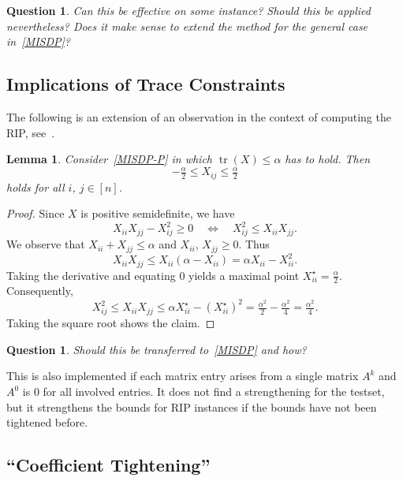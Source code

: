 \documentclass[10pt, a4paper]{article}
\DeclareMathOperator{\tr}{tr}
\newtheorem{lemma}[theorem]{Lemma}
\newtheorem{question}[theorem]{Question}
\begin{document}
\begin{question}
  Can this be effective on some instance? Should this be applied
  nevertheless? Does it make sense to extend the method for the general
  case in~\eqref{MISDP}?
\end{question}

\subsection{Implications of Trace Constraints}

The following is an extension of an observation in the context of computing
the RIP, see~\cite{GalP16}.

\begin{lemma}
  Consider~\eqref{MISDP-P} in which $\tr(X) \leq \alpha$ has to hold. Then
  \[
    -\tfrac{\alpha}{2} \leq X_{ij} \leq \tfrac{\alpha}{2}
  \]
  holds for all $i$, $j \in [n]$.
\end{lemma}

\begin{proof}
  Since $X$ is positive semidefinite, we have
  \[
    X_{ii} X_{jj} - X_{ij}^2 \geq 0
    \quad\Leftrightarrow\quad
    X_{ij}^2 \leq X_{ii} X_{jj}.
  \]
  We observe that $X_{ii} + X_{jj} \leq \alpha$ and $X_{ii}$,
  $X_{jj} \geq 0$. Thus
  \[
    X_{ii} X_{jj} \leq X_{ii} (\alpha - X_{ii}) = \alpha X_{ii} - X_{ii}^2.
  \]
  Taking the derivative and equating 0 yields a maximal point
  $X_{ii}^\star = \tfrac{\alpha}{2}$. Consequently,
  \[
    X_{ij}^2 \leq X_{ii} X_{jj} \leq \alpha X_{ii}^\star - (X_{ii}^\star)^2 =
    \tfrac{\alpha^2}{2} - \tfrac{\alpha^2}{4} = \tfrac{\alpha^2}{4}.
  \]
  Taking the square root shows the claim.
\end{proof}

\begin{question}
  Should this be transferred to~\eqref{MISDP} and how?
\end{question}

This is also implemented if each matrix entry arises from a single matrix
$A^k$ and $A^0$ is 0 for all involved entries. It does not find a
strengthening for the testset, but it strengthens the bounds for RIP
instances if the bounds have not been tightened before.

\subsection{``Coefficient Tightening''}
\label{sec:CoefficientTightening}
\end{document}
